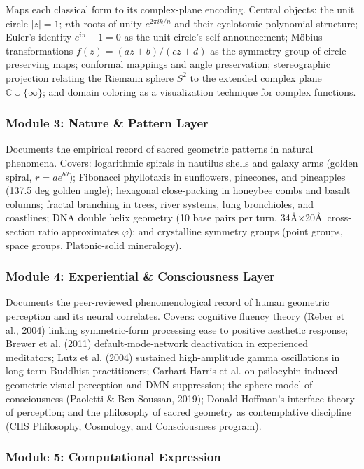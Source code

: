 \documentclass[11pt,letterpaper]{article}
\begin{document}
Maps each classical form to its complex-plane encoding. Central objects: the unit circle $|z|=1$; $n$th roots of unity $e^{2\pi ik/n}$ and their cyclotomic polynomial structure; Euler's identity $e^{i\pi}+1=0$ as the unit circle's self-announcement; M\"{o}bius transformations $f(z) = (az+b)/(cz+d)$ as the symmetry group of circle-preserving maps; conformal mappings and angle preservation; stereographic projection relating the Riemann sphere $S^2$ to the extended complex plane $\mathbb{C} \cup \{\infty\}$; and domain coloring as a visualization technique for complex functions.

\subsubsection{Module 3: Nature \& Pattern Layer}

Documents the empirical record of sacred geometric patterns in natural phenomena. Covers: logarithmic spirals in nautilus shells and galaxy arms (golden spiral, $r = ae^{b\theta}$); Fibonacci phyllotaxis in sunflowers, pinecones, and pineapples (137.5 deg golden angle); hexagonal close-packing in honeybee combs and basalt columns; fractal branching in trees, river systems, lung bronchioles, and coastlines; DNA double helix geometry (10 base pairs per turn, 34\AA$\times$20\AA\ cross-section ratio approximates $\varphi$); and crystalline symmetry groups (point groups, space groups, Platonic-solid mineralogy).

\subsubsection{Module 4: Experiential \& Consciousness Layer}

Documents the peer-reviewed phenomenological record of human geometric perception and its neural correlates. Covers: cognitive fluency theory (Reber et al., 2004) linking symmetric-form processing ease to positive aesthetic response; Brewer et al. (2011) default-mode-network deactivation in experienced meditators; Lutz et al. (2004) sustained high-amplitude gamma oscillations in long-term Buddhist practitioners; Carhart-Harris et al. on psilocybin-induced geometric visual perception and DMN suppression; the sphere model of consciousness (Paoletti \& Ben Soussan, 2019); Donald Hoffman's interface theory of perception; and the philosophy of sacred geometry as contemplative discipline (CIIS Philosophy, Cosmology, and Consciousness program).

\subsubsection{Module 5: Computational Expression}
\end{document}
